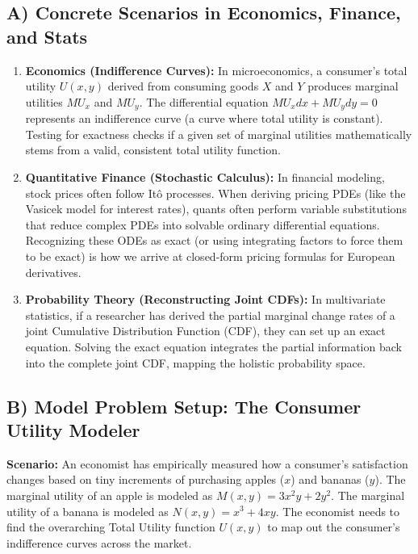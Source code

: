 \documentclass[11pt]{article}
\begin{document}
\subsection{A) Concrete Scenarios in Economics, Finance, and Stats}
\begin{enumerate}
    \item \textbf{Economics (Indifference Curves):} In microeconomics, a consumer's total utility $U(x,y)$ derived from consuming goods $X$ and $Y$ produces marginal utilities $MU_x$ and $MU_y$. The differential equation $MU_x dx + MU_y dy = 0$ represents an indifference curve (a curve where total utility is constant). Testing for exactness checks if a given set of marginal utilities mathematically stems from a valid, consistent total utility function.
    \item \textbf{Quantitative Finance (Stochastic Calculus):} In financial modeling, stock prices often follow Itô processes. When deriving pricing PDEs (like the Vasicek model for interest rates), quants often perform variable substitutions that reduce complex PDEs into solvable ordinary differential equations. Recognizing these ODEs as exact (or using integrating factors to force them to be exact) is how we arrive at closed-form pricing formulas for European derivatives.
    \item \textbf{Probability Theory (Reconstructing Joint CDFs):} In multivariate statistics, if a researcher has derived the partial marginal change rates of a joint Cumulative Distribution Function (CDF), they can set up an exact equation. Solving the exact equation integrates the partial information back into the complete joint CDF, mapping the holistic probability space.
\end{enumerate}

\subsection{B) Model Problem Setup: The Consumer Utility Modeler}
\textbf{Scenario:} An economist has empirically measured how a consumer's satisfaction changes based on tiny increments of purchasing apples ($x$) and bananas ($y$). 
The marginal utility of an apple is modeled as $M(x,y) = 3x^2y + 2y^2$. 
The marginal utility of a banana is modeled as $N(x,y) = x^3 + 4xy$.
The economist needs to find the overarching Total Utility function $U(x,y)$ to map out the consumer's indifference curves across the market.
\end{document}
